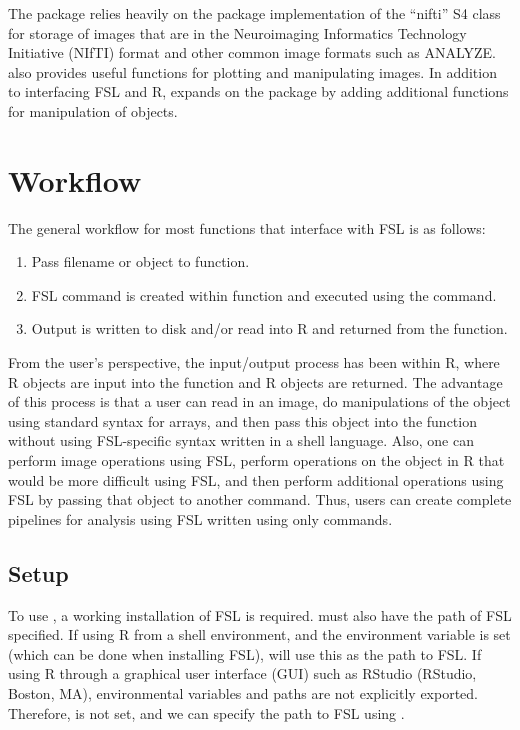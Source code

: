 The  package relies heavily on the  \citep{whitcher_working_2011} package implementation of the ``nifti'' S4 class for storage of images that are in the Neuroimaging Informatics Technology Initiative (NIfTI) format and other common image formats such as ANALYZE.  also provides useful functions for plotting and manipulating images.  In addition to interfacing FSL and R,  expands on the  package by adding additional functions for manipulation of  objects.


\section{ Workflow}
The general workflow for most  functions that interface with FSL is as follows:
\begin{enumerate}
\item Pass filename or  object to  function.
\item FSL command is created within  function and executed using the  command.
\item Output is written to disk and/or read into R and returned from the function.
\end{enumerate}

From the user's perspective, the input/output process has been within R, where R objects are input into the function and R objects are returned.  The advantage of this process is that a user can read in an image, do manipulations of the  object using standard syntax for arrays, and then pass this object into the  function without using FSL-specific syntax written in a shell language.  Also, one can perform image operations using FSL, perform operations on the  object in R that would be more difficult using FSL, and then perform additional operations using FSL by passing that object to another  command.  Thus, users can create complete pipelines for analysis using FSL written using only  commands.

\subsection{ Setup}
To use , a working installation of FSL is required.   must also have the path of FSL specified.  If using R from a shell environment, and the  environment variable is set (which can be done when installing FSL),  will use this as the path to FSL.  If using R through a graphical user interface (GUI) such as RStudio (RStudio, Boston, MA), environmental variables and paths are not explicitly exported.  Therefore,  is not set, and we can specify the path to FSL using . 

